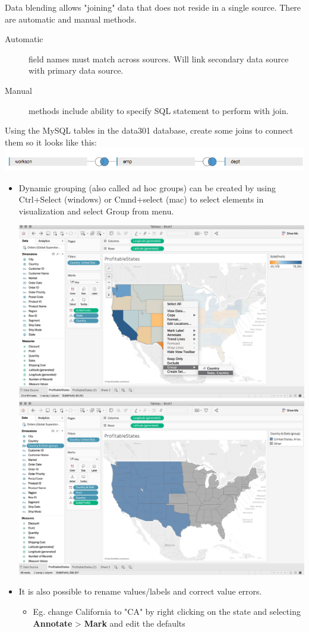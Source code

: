 \documentclass[xcolor=svgnames]{beamer} %
\begin{document}
\begin{frame}
Data blending allows "joining" data that does not reside in a single source.  There are automatic and manual methods.
\begin{description}
\item [Automatic] field names must match across sources. Will link secondary data source with primary data source.
\item [Manual] methods include ability to specify SQL statement to perform with join.

\end{description}
\end{frame}

\begin{frame}
Using the MySQL tables in the data301 database, create some joins to connect them so it looks like this:
\includegraphics[width=1.1\textwidth]{img/mySQLjoin.png}


\end{frame}



\begin{frame}
\begin{itemize}
\item Dynamic grouping (also called ad hoc groups) can be created by using Ctrl+Select (windows) or Cmnd+select (mac) to select elements in visualization and select Group from menu.\vfill
\begin{center}
\includegraphics[width=.45\textwidth]{img/group1}\includegraphics[width=.45\textwidth]{img/group2}
\end{center}


\item It is also possible to rename values/labels and correct value errors.
\begin{itemize}
\item Eg. change California to "CA" by right clicking on the state and selecting {\bf Annotate} > {\bf Mark} and edit the defaults
\end{itemize}


\end{itemize}
\end{frame}
\end{document}
